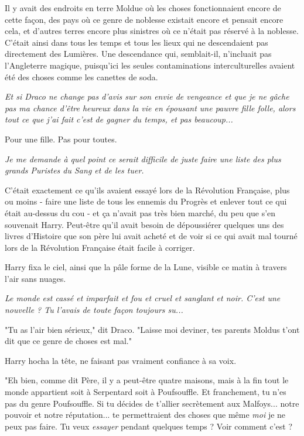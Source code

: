 Il y avait des endroits en terre Moldue où les choses fonctionnaient encore de cette façon, des pays où ce genre de noblesse existait encore et pensait encore cela, et d'autres terres encore plus sinistres où ce n'était pas réservé à la noblesse. C'était ainsi dans tous les temps et tous les lieux qui ne descendaient pas directement des Lumières. Une descendance qui, semblait-il, n'incluait pas l'Angleterre magique, puisqu'ici les seules contaminations interculturelles avaient été des choses comme les canettes de soda.

\emph{Et si Draco ne change pas d'avis sur son envie de vengeance et que je ne gâche pas ma chance d'être heureux dans la vie en épousant une pauvre fille folle, alors tout ce que j'ai fait c'est de gagner du temps, et pas beaucoup...} 

Pour une fille. Pas pour toutes.

\emph{Je me demande à quel point ce serait difficile de juste faire une liste des plus grands Puristes du Sang et de les tuer.} 

C'était exactement ce qu'ils avaient essayé lors de la Révolution Française, plus ou moins - faire une liste de tous les ennemis du Progrès et enlever tout ce qui était au-dessus du cou - et ça n'avait pas très bien marché, du peu que s'en souvenait Harry. Peut-être qu'il avait besoin de dépoussiérer quelques uns des livres d'Histoire que son père lui avait acheté et de voir si ce qui avait mal tourné lors de la Révolution Française était facile à corriger.

Harry fixa le ciel, ainsi que la pâle forme de la Lune, visible ce matin à travers l'air sans nuages.

\emph{Le monde est cassé et imparfait et fou et cruel et sanglant et noir. C'est une nouvelle ? Tu l'avais de toute façon toujours su...} 

"Tu as l'air bien sérieux," dit Draco. "Laisse moi deviner, tes parents Moldus t'ont dit que ce genre de choses est mal."

Harry hocha la tête, ne faisant pas vraiment confiance à sa voix.

"Eh bien, comme dit Père, il y a peut-être quatre maisons, mais à la fin tout le monde appartient soit à Serpentard soit à Poufsouffle. Et franchement, tu n'es pas du genre Poufsouffle. Si tu décides de t'allier secrètement aux Malfoys... notre pouvoir et notre réputation... te permettraient des choses que même \emph{moi}  je ne peux pas faire. Tu veux \emph{essayer}  pendant quelques temps ? Voir comment c'est ?

